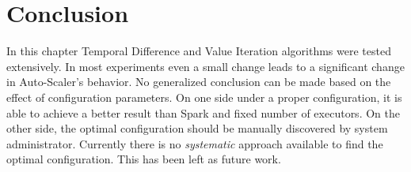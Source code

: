 \section{Conclusion}

In this chapter Temporal Difference and Value Iteration algorithms were tested extensively. In most experiments even a small change leads to a significant change in Auto-Scaler's behavior. No generalized conclusion can be made based on the effect of configuration parameters. On one side under a proper configuration, it is able to achieve a better result than Spark and fixed number of executors. On the other side, the optimal configuration should be manually discovered by system administrator. Currently there is no \emph{systematic} approach available to find the optimal configuration. This has been left as future work.